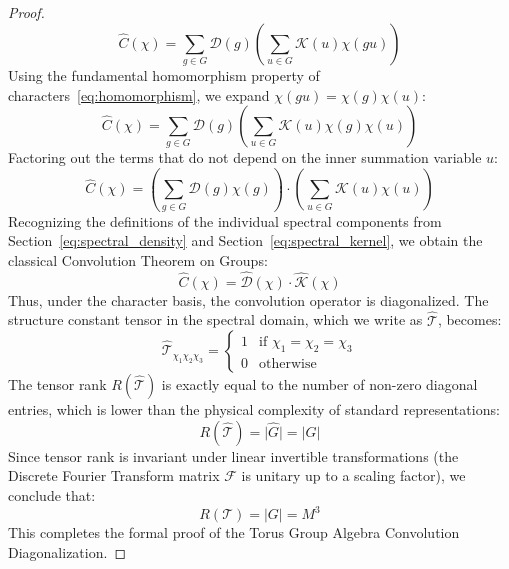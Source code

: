 \documentclass[11pt,a4paper]{book}
\begin{document}
\begin{proof}
\begin{equation}
\widehat{C}(\chi) = \sum_{g \in G} \mathcal{D}(g) \left( \sum_{u \in G} \mathcal{K}(u) \chi(g u) \right)
\end{equation}
Using the fundamental homomorphism property of characters~\eqref{eq:homomorphism}, we expand $\chi(g u) = \chi(g) \chi(u)$:
\begin{equation}
\label{eq:proof_step_4}
\widehat{C}(\chi) = \sum_{g \in G} \mathcal{D}(g) \left( \sum_{u \in G} \mathcal{K}(u) \chi(g)\chi(u) \right)
\end{equation}
Factoring out the terms that do not depend on the inner summation variable $u$:
\begin{equation}
\label{eq:proof_step_5}
\widehat{C}(\chi) = \left( \sum_{g \in G} \mathcal{D}(g) \chi(g) \right) \cdot \left( \sum_{u \in G} \mathcal{K}(u) \chi(u) \right)
\end{equation}
Recognizing the definitions of the individual spectral components from Section~\ref{eq:spectral_density} and Section~\ref{eq:spectral_kernel}, we obtain the classical Convolution Theorem on Groups:
\begin{equation}
\label{eq:convolution_theorem}
\widehat{C}(\chi) = \widehat{\mathcal{D}}(\chi) \cdot \widehat{\mathcal{K}}(\chi)
\end{equation}
Thus, under the character basis, the convolution operator is diagonalized. The structure constant tensor in the spectral domain, which we write as $\widehat{\mathcal{T}}$, becomes:
\begin{equation}
\label{eq:spectral_tensor}
\widehat{\mathcal{T}}_{\chi_1 \chi_2 \chi_3} = \begin{cases} 1 & \text{if } \chi_1 = \chi_2 = \chi_3 \\ 0 & \text{otherwise} \end{cases}
\end{equation}
The tensor rank $R(\widehat{\mathcal{T}})$ is exactly equal to the number of non-zero diagonal entries, which is lower than the physical complexity of standard representations:
\begin{equation}
\label{eq:rank_collapse}
R(\widehat{\mathcal{T}}) = \lvert \widehat{G} \rvert = \lvert G \rvert
\end{equation}
Since tensor rank is invariant under linear invertible transformations (the Discrete Fourier Transform matrix $\mathcal{F}$ is unitary up to a scaling factor), we conclude that:
\begin{equation}
\label{eq:rank_final}
R(\mathcal{T}) = \lvert G \rvert = M^3
\end{equation}
This completes the formal proof of the Torus Group Algebra Convolution Diagonalization.
\end{proof}
\end{document}
